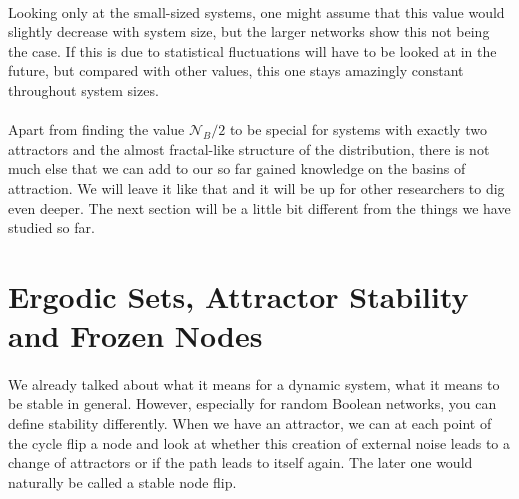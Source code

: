 \paragraph{}
{
	\centering
	 \par 
}
\paragraph*{}
Looking only at the small-sized systems, one might assume that this value would slightly decrease with system size, but the larger networks show this not being the case. If this is due to statistical fluctuations will have to be looked at in the future, but compared with other values, this one stays amazingly constant throughout system sizes.

\paragraph*{}
Apart from finding the value $\mathcal{N}_B/2$ to be special for systems with exactly two attractors and the almost fractal-like structure of the distribution, there is not much else that we can add to our so far gained knowledge on the basins of attraction. We will leave it like that and it will be up for other researchers to dig even deeper. The next section will be a little bit different from the things we have studied so far.

\section{Ergodic Sets, Attractor Stability and Frozen Nodes}\label{sec:ergodic_sets}
\paragraph*{}
We already talked about what it means for a dynamic system, what it means to be stable in general. However, especially for random Boolean networks, you can define stability differently. When we have an attractor, we can at each point of the cycle flip a node and look at whether this creation of external noise leads to a change of attractors or if the path leads to itself again. The later one would naturally be called a stable node flip.
